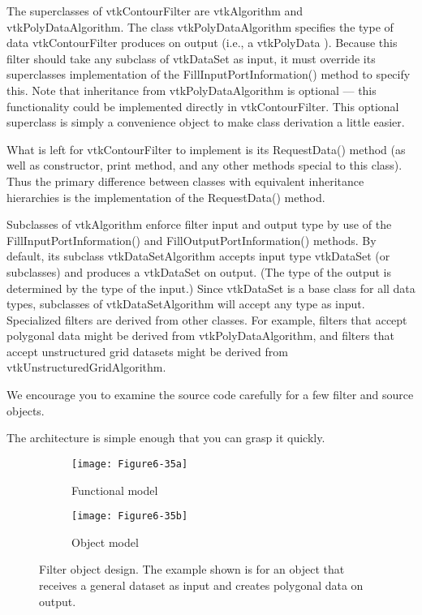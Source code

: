 \begin{description}[leftmargin=0cm,labelindent=0cm]
The superclasses of vtkContourFilter are vtkAlgorithm and vtkPolyDataAlgorithm. The class vtkPolyDataAlgorithm specifies the type of data vtkContourFilter produces on output (i.e., a vtkPolyData ). Because this filter should take any subclass of vtkDataSet as input, it must override its superclasses implementation of the FillInputPortInformation() method to specify this. Note that inheritance from vtkPolyDataAlgorithm is optional --- this functionality could be implemented directly in vtkContourFilter. This optional superclass is simply a convenience object to make class derivation a little easier.

What is left for vtkContourFilter to implement is its RequestData() method (as well as constructor, print method, and any other methods special to this class). Thus the primary difference between classes with equivalent inheritance hierarchies is the implementation of the RequestData() method.

Subclasses of vtkAlgorithm enforce filter input and output type by use of the FillInputPortInformation() and FillOutputPortInformation() methods. By default, its subclass vtkDataSetAlgorithm accepts input type vtkDataSet (or subclasses) and produces a vtkDataSet on output. (The type of the output is determined by the type of the input.) Since vtkDataSet is a base class for all data types, subclasses of vtkDataSetAlgorithm will accept any type as input. Specialized filters are derived from other classes. For example, filters that accept polygonal data might be derived from vtkPolyDataAlgorithm, and filters that accept unstructured grid datasets might be derived from vtkUnstructuredGridAlgorithm.

We encourage you to examine the source code carefully for a few filter and source objects.

The architecture is simple enough that you can grasp it quickly.

\begin{figure}[htb]
	\begin{subfigure}[h]{0.48\linewidth}
		\texttt{[image: Figure6-35a]}
		\caption{Functional model}
		\label{fig:Figure6-35a}
	\end{subfigure}
	\hfill
	\begin{subfigure}[h]{0.48\linewidth}
		\texttt{[image: Figure6-35b]}
		\caption{Object model}
		\label{fig:Figure6-35b}
	\end{subfigure}
	\caption{Filter object design. The example shown is for an object that receives a general dataset as input and creates polygonal data on output.}\label{fig:Figure6-35}
\end{figure}


\end{description}
